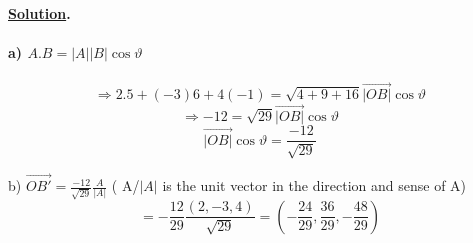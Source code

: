 \documentclass[11pt]{amsbook}
\begin{document}
\paragraph{ \underline{Solution}. \\}
\paragraph{ a) $ A.B = |A| |B| \cos\vartheta $}

\[
	\Rightarrow  2.5 + (-3)6 + 4(-1) = \sqrt{4+9+16} \vec{|OB|} \cos\vartheta
\]
\[
	\Rightarrow -12=\sqrt{29}\vec{|OB|} \cos\vartheta
\]
\[
	\vec{|OB|} \cos\vartheta= \frac{-12}{\sqrt{29}}
\]

b) $\vec{OB'}=  \frac{-12}{\sqrt{29}} \frac{A}{|A|}$ ( A/$|A|$ is the unit vector in the direction and sense of A)
\[
=- \frac{12}{29} \frac{(2, -3, 4)}{\sqrt{29}} =( -\frac{24}{29}, \frac{36}{29}, -\frac{48}{29} )
\]




 






\end{document}
